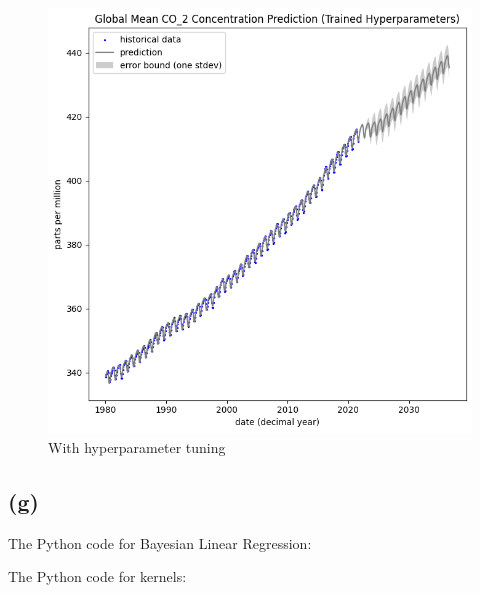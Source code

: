 \documentclass[12pt]{article}
\begin{document}
\begin{figure}[h]
\begin{minipage}{.5\textwidth}
\includegraphics[scale=0.5]{outputs/q2/f-extrapolation-trained}
\caption{With hyperparameter tuning}
\label{fig:f-extrapolation-trained}
\end{minipage}
\end{figure}
%
%

\subsection*{(g)}


\newpage
The Python code for Bayesian Linear Regression:


\newpage
The Python code for kernels:

\end{document}
